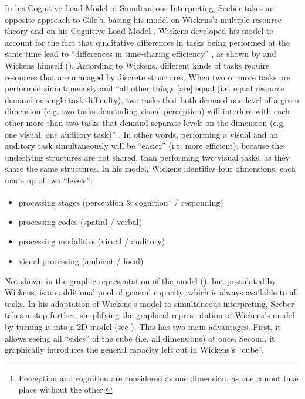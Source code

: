 \documentclass[output=paper]{langsci/langscibook}
\begin{document}
In his Cognitive Load Model of Simultaneous Interpreting, Seeber takes an opposite approach to Gile’s, basing his model on Wickens’s multiple resource theory and on his Cognitive Load Model \citeyear{Wickens1984, Wickens2002}. Wickens developed his model to account for the fact that qualitative differences in tasks being performed at the same time lead to ``differences in time-sharing efficiency'' \citep[162]{Wickens2002}, as shown by \citeauthor{Kantowitz1976} and Wickens himself (\citeyear{Wickens1976}). According to Wickens, different kinds of tasks require resources that are managed by discrete structures. When two or more tasks are performed simultaneously and ``all other things [are] equal (i.e. equal resource demand or single task difficulty), two tasks that both demand one level of a given dimension (e.g. two tasks demanding visual perception) will interfere with each other more than two tasks that demand separate levels on the dimension (e.g. one visual, one auditory task)'' \citep{Wickens2002}. In other words, performing a visual and an auditory task simultaneously will be ``easier'' (i.e. more efficient), because the underlying structures are not shared, than performing two visual tasks, as they share the same structures. In his model, Wickens identifies four dimensions, each made up of two ``levels'':

\begin{itemize}
\item processing stages (perception \& cognition\footnote{Perception and cognition are considered as one dimension, as one cannot take place without the other.} / responding)
\item processing codes (spatial / verbal)
\item processing modalities (visual / auditory)
\item visual processing (ambient / focal)
\end{itemize}

Not shown in the graphic representation of the model (), but postulated by Wickens, is an additional pool of general capacity, which is always available to all tasks. In his adaptation of Wickens’s model to simultaneous interpreting, Seeber takes a step further, simplifying the graphical representation of Wickens’s model by turning it into a 2D model (see ). This has two main advantages. First, it allows seeing all ``sides'' of the cube (i.e. all dimensions) at once. Second, it graphically introduces the general capacity left out in Wickens’s ``cube''. 
\end{document}
